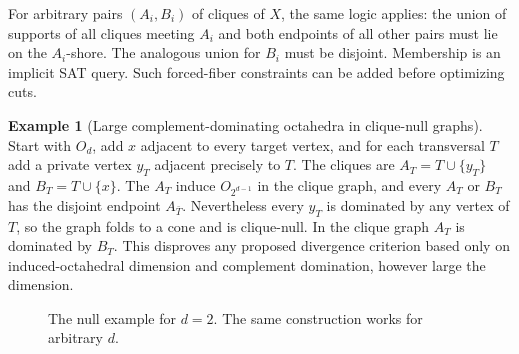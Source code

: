 \documentclass[11pt,a4paper]{article}
\theoremstyle{definition}\newtheorem{definition}[theorem]{Definition}\newtheorem{example}[theorem]{Example}
\theoremstyle{remark}\newtheorem{remark}[theorem]{Remark}
\begin{document}
For arbitrary pairs \((A_i,B_i)\) of cliques of \(X\), the same logic applies: the union of supports of all cliques meeting \(A_i\) and both endpoints of all other pairs must lie on the \(A_i\)-shore. The analogous union for \(B_i\) must be disjoint. Membership is an implicit SAT query. Such forced-fiber constraints can be added before optimizing cuts.

\begin{example}[Large complement-dominating octahedra in clique-null graphs]\label{ex:false}
Start with \(O_d\), add \(x\) adjacent to every target vertex, and for each transversal \(T\) add a private vertex \(y_T\) adjacent precisely to \(T\). The cliques are \(A_T=T\cup\{y_T\}\) and \(B_T=T\cup\{x\}\). The \(A_T\) induce \(O_{2^{d-1}}\) in the clique graph, and every \(A_T\) or \(B_T\) has the disjoint endpoint \(A_{\bar T}\). Nevertheless every \(y_T\) is dominated by any vertex of \(T\), so the graph folds to a cone and is clique-null. In the clique graph \(A_T\) is dominated by \(B_T\). This disproves any proposed divergence criterion based only on induced-octahedral dimension and complement domination, however large the dimension.
\end{example}
\begin{figure}[ht]\centering
{}
\caption{The null example for \(d=2\). The same construction works for arbitrary \(d\).}\end{figure}
\end{document}
